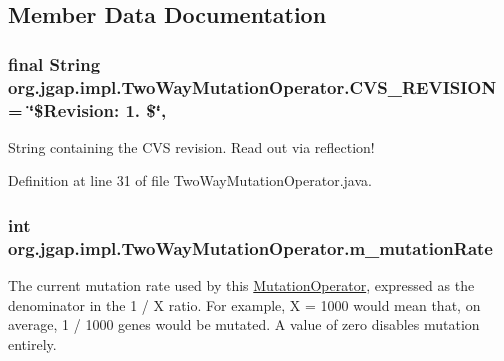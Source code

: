 \subsection{Member Data Documentation}
\hypertarget{classorg_1_1jgap_1_1impl_1_1_two_way_mutation_operator_a73f3278e9f25c5ceaa6ec002c0c409bb}{
\subsubsection[{C\-V\-S\-\_\-\-R\-E\-V\-I\-S\-I\-O\-N}]{\setlength{\rightskip}{0pt plus 5cm}final String org.\-jgap.\-impl.\-Two\-Way\-Mutation\-Operator.\-C\-V\-S\-\_\-\-R\-E\-V\-I\-S\-I\-O\-N = \char`\"{}\$Revision\-: 1. \$\char`\"{}\hspace{0.3cm}{\ttfamily [static]}, {\ttfamily [private]}}}\label{classorg_1_1jgap_1_1impl_1_1_two_way_mutation_operator_a73f3278e9f25c5ceaa6ec002c0c409bb}
String containing the C\-V\-S revision. Read out via reflection! 

Definition at line 31 of file Two\-Way\-Mutation\-Operator.\-java.

\hypertarget{classorg_1_1jgap_1_1impl_1_1_two_way_mutation_operator_a9f751ed8c191fd900a05714a2f4e4d9b}{
\subsubsection[{m\-\_\-mutation\-Rate}]{\setlength{\rightskip}{0pt plus 5cm}int org.\-jgap.\-impl.\-Two\-Way\-Mutation\-Operator.\-m\-\_\-mutation\-Rate\hspace{0.3cm}{\ttfamily [private]}}}\label{classorg_1_1jgap_1_1impl_1_1_two_way_mutation_operator_a9f751ed8c191fd900a05714a2f4e4d9b}
The current mutation rate used by this \hyperlink{classorg_1_1jgap_1_1impl_1_1_mutation_operator}{Mutation\-Operator}, expressed as the denominator in the 1 / X ratio. For example, X = 1000 would mean that, on average, 1 / 1000 genes would be mutated. A value of zero disables mutation entirely. 

